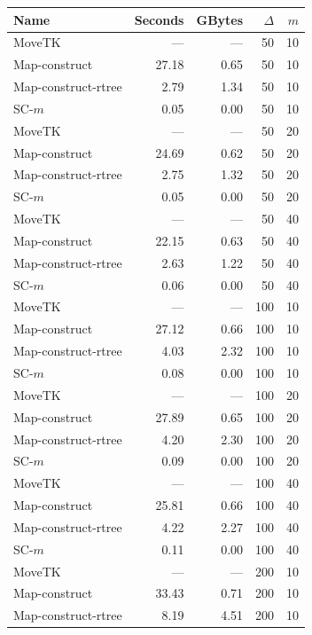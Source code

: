 
    \begin{figure} \begin{center}
    \begin{minipage}{0.5\textwidth}
    \begin{tabular}{@{}lrrrr@{}}
        \toprule
        Name & Seconds & GBytes & $\Delta$ & $m$\\
        \midrule
        MoveTK & --- & --- & 50 & 10\\
Map-construct & 27.18 & 0.65 & 50 & 10\\
Map-construct-rtree & 2.79 & 1.34 & 50 & 10\\
        \medskip
SC-$m$ & 0.05 & 0.00 & 50 & 10\\
        MoveTK & --- & --- & 50 & 20\\
Map-construct & 24.69 & 0.62 & 50 & 20\\
Map-construct-rtree & 2.75 & 1.32 & 50 & 20\\
        \medskip
SC-$m$ & 0.05 & 0.00 & 50 & 20\\
        MoveTK & --- & --- & 50 & 40\\
Map-construct & 22.15 & 0.63 & 50 & 40\\
Map-construct-rtree & 2.63 & 1.22 & 50 & 40\\
        \medskip
SC-$m$ & 0.06 & 0.00 & 50 & 40\\
        MoveTK & --- & --- & 100 & 10\\
Map-construct & 27.12 & 0.66 & 100 & 10\\
Map-construct-rtree & 4.03 & 2.32 & 100 & 10\\
        \medskip
SC-$m$ & 0.08 & 0.00 & 100 & 10\\
        MoveTK & --- & --- & 100 & 20\\
Map-construct & 27.89 & 0.65 & 100 & 20\\
Map-construct-rtree & 4.20 & 2.30 & 100 & 20\\
        \medskip
SC-$m$ & 0.09 & 0.00 & 100 & 20\\
        MoveTK & --- & --- & 100 & 40\\
Map-construct & 25.81 & 0.66 & 100 & 40\\
Map-construct-rtree & 4.22 & 2.27 & 100 & 40\\
        \medskip
SC-$m$ & 0.11 & 0.00 & 100 & 40\\
        MoveTK & --- & --- & 200 & 10\\
Map-construct & 33.43 & 0.71 & 200 & 10\\
Map-construct-rtree & 8.19 & 4.51 & 200 & 10\\

\end{tabular}
\end{minipage}
\end{center}
\end{figure}
